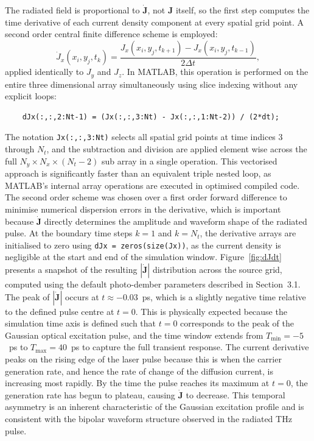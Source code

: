 \documentclass[12pt]{final_project_report}
\begin{document}
The radiated field is proportional to $\dot{\mathbf{J}}$, not $\mathbf{J}$ itself, so the first step computes the time derivative of each current density component at every spatial grid point. A second order central finite difference scheme is employed:
\begin{equation}
    \dot{J}_x(x_i, y_j, t_k) = \frac{J_x(x_i, y_j, t_{k+1}) - J_x(x_i, y_j, t_{k-1})}{2\Delta t},
\end{equation}
applied identically to $J_y$ and $J_z$. In MATLAB, this operation is performed on the entire three dimensional array simultaneously using slice indexing without any explicit loops:
\begin{verbatim}
    dJx(:,:,2:Nt-1) = (Jx(:,:,3:Nt) - Jx(:,:,1:Nt-2)) / (2*dt);
\end{verbatim}
The notation \texttt{Jx(:,:,3:Nt)} selects all spatial grid points at time indices 3 through $N_t$, and the subtraction and division are applied element wise across the full $N_y \times N_x \times (N_t - 2)$ sub array in a single operation. This vectorised approach is significantly faster than an equivalent triple nested loop, as MATLAB's internal array operations are executed in optimised compiled code. The second order scheme was chosen over a first order forward difference to minimise numerical dispersion errors in the derivative, which is important because $\dot{\mathbf{J}}$ directly determines the amplitude and waveform shape of the radiated pulse. At the boundary time steps $k = 1$ and $k = N_t$, the derivative arrays are initialised to zero using \texttt{dJx = zeros(size(Jx))}, as the current density is negligible at the start and end of the simulation window.\newline
Figure~\ref{fig:dJdt} presents a snapshot of the resulting $|\dot{\mathbf{J}}|$ distribution across the source grid, computed using the default photo-dember parameters described in Section~3.1. The peak of $|\dot{\mathbf{J}}|$ occurs at $t \approx -0.03$~ps, which is a slightly negative time relative to the defined pulse centre at $t = 0$. This is physically expected because the simulation time axis is defined such that $t = 0$ corresponds to the peak of the Gaussian optical excitation pulse, and the time window extends from $T_{\mathrm{min}} = -5$~ps to $T_{\mathrm{max}} = 40$~ps to capture the full transient response. The current derivative peaks on the rising edge of the laser pulse because this is when the carrier generation rate, and hence the rate of change of the diffusion current, is increasing most rapidly. By the time the pulse reaches its maximum at $t = 0$, the generation rate has begun to plateau, causing $\dot{\mathbf{J}}$ to decrease. This temporal asymmetry is an inherent characteristic of the Gaussian excitation profile and is consistent with the bipolar waveform structure observed in the radiated THz pulse.
\end{document}
